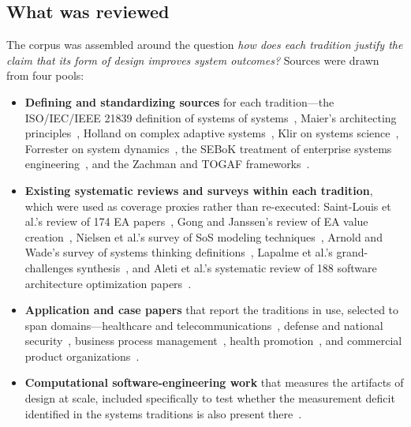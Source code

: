 \documentclass[11pt,a4paper]{article}
\begin{document}
\subsection{What was reviewed}

The corpus was assembled around the question \emph{how does each tradition
justify the claim that its form of design improves system outcomes?} Sources
were drawn from four pools:

\begin{itemize}
\item \textbf{Defining and standardizing sources} for each tradition---the
ISO/IEC/IEEE 21839 definition of systems of systems~\citep{iso21839}, Maier's
architecting principles~\citep{maier1998}, Holland on complex adaptive
systems~\citep{holland1992}, Klir on systems science~\citep{klir2001}, Forrester
on system dynamics~\citep{forrester2009}, the SEBoK treatment of enterprise
systems engineering~\citep{sebok_ese2024}, and the Zachman and TOGAF
frameworks~\citep{zachman_nd,bente2012}.

\item \textbf{Existing systematic reviews and surveys within each tradition},
which were used as coverage proxies rather than re-executed: Saint-Louis et
al.'s review of 174 EA papers~\citep{saintlouis2017}, Gong and Janssen's review
of EA value creation~\citep{gong2019}, Nielsen et al.'s survey of SoS modeling
techniques~\citep{nielsen2015}, Arnold and Wade's survey of systems thinking
definitions~\citep{arnold2015}, Lapalme et al.'s grand-challenges
synthesis~\citep{lapalme2016}, and Aleti et al.'s systematic review of 188
software architecture optimization papers~\citep{aleti2013}.

\item \textbf{Application and case papers} that report the traditions in use,
selected to span domains---healthcare and telecommunications~\citep{kotze2016},
defense and national security~\citep{morgan2023}, business process
management~\citep{fleischmann2016}, health promotion~\citep{vanbeurden2011}, and
commercial product organizations~\citep{dunne2018,monat2020}.

\item \textbf{Computational software-engineering work} that measures the
artifacts of design at scale, included specifically to test whether the
measurement deficit identified in the systems traditions is also present
there~\citep{aleti2013,mahadi2021,tawosi2022,zangari2023,kleebaum2021,sharma2021,dhaouadi2023}.
\end{itemize}
\end{document}
